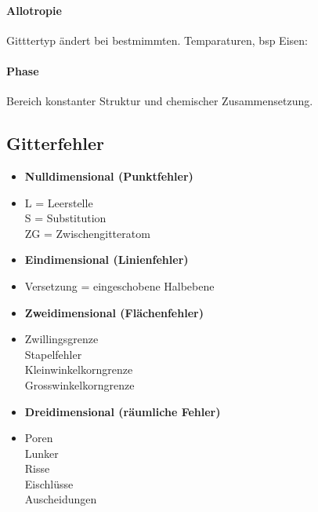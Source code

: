 \documentclass[12pt,twocolumn]{article}
\begin{document}
    \paragraph{Allotropie}Gitttertyp ändert bei bestmimmten. Temparaturen, bsp Eisen:
    \paragraph{Phase} Bereich konstanter Struktur und chemischer
    Zusammensetzung.
    \subsection*{Gitterfehler}
     \begin{minipage}[t]{0.5\columnwidth}
        \begin{itemize}[label={}, leftmargin=*, itemsep=0.01em]
            \item \textbf{Nulldimensional (Punktfehler)}
            \item L = Leerstelle \\ S = Substitution \\  ZG = Zwischengitteratom
        \end{itemize}
    \end{minipage}\hfill
    \begin{minipage}[t]{0.5\columnwidth}
        \begin{itemize}[label={}, leftmargin=*,  itemsep=0.01em]
            \item \textbf{Eindimensional (Linienfehler)}
            \item Versetzung = eingeschobene Halbebene
        \end{itemize}
    \end{minipage}\hfill
    \begin{minipage}[t]{0.5\columnwidth}
        \begin{itemize}[label={}, leftmargin=*, itemsep=0.01em]
            \item \textbf{Zweidimensional (Flächenfehler)}
            \item Zwillingsgrenze \\ Stapelfehler \\ Kleinwinkelkorngrenze \\ Grosswinkelkorngrenze
        \end{itemize}
    \end{minipage}\hfill
    \begin{minipage}[t]{0.5\columnwidth}
        \begin{itemize}[label={}, leftmargin=*,  itemsep=0.01em]
            \item \textbf{Dreidimensional (räumliche Fehler)}
            \item Poren \\ Lunker \\ Risse \\ Eischlüsse \\ Auscheidungen 
        \end{itemize}
    \end{minipage}\hfill
\end{document}
